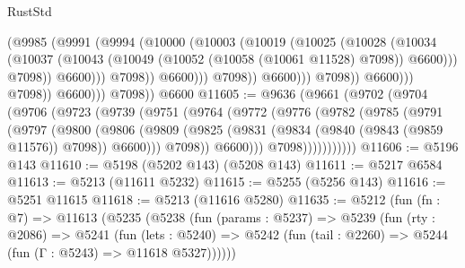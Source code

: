 \begin{lexlean}{RustStd}
\begin{coremodule}
                                        (@9985
                                          (@9991
                                            (@9994
                                              (@10000
                                                (@10003
                                                  (@10019
                                                    (@10025
                                                      (@10028
                                                        (@10034
                                                          (@10037
                                                            (@10043
                                                              (@10049
                                                                (@10052
                                                                  (@10058 (@10061 @11528) @7098))
                                                                @6600)))
                                                          @7098))
                                                      @6600)))
                                                @7098))
                                            @6600)))
                                      @7098))
                                  @6600)))
                            @7098))
                        @6600)))
                  @7098))
              @6600)))
        @7098))
    @6600
@11605 := @9636
    (@9661
      (@9702
        (@9704
          (@9706
            (@9723
              (@9739
                (@9751
                  (@9764
                    (@9772
                      (@9776
                        (@9782
                          (@9785
                            (@9791
                              (@9797
                                (@9800
                                  (@9806
                                    (@9809
                                      (@9825
                                        (@9831 (@9834 (@9840 (@9843 (@9859 @11576)) @7098)) @6600)))
                                    @7098))
                                @6600)))
                          @7098)))))))))))
@11606 := @5196 @143
@11610 := @5198 (@5202 @143) (@5208 @143)
@11611 := @5217 @6584
@11613 := @5213 (@11611 @5232)
@11615 := @5255 (@5256 @143)
@11616 := @5251 @11615
@11618 := @5213 (@11616 @5280)
@11635 := @5212
    (fun (fn : @7) =>
    @11613
      (@5235
        (@5238
          (fun (params : @5237) =>
          @5239
            (fun (rty : @2086) =>
            @5241
              (fun (lets : @5240) =>
              @5242 (fun (tail : @2260) => @5244 (fun (Γ : @5243) => @11618 @5327))))))

\end{coremodule}
\end{lexlean}
